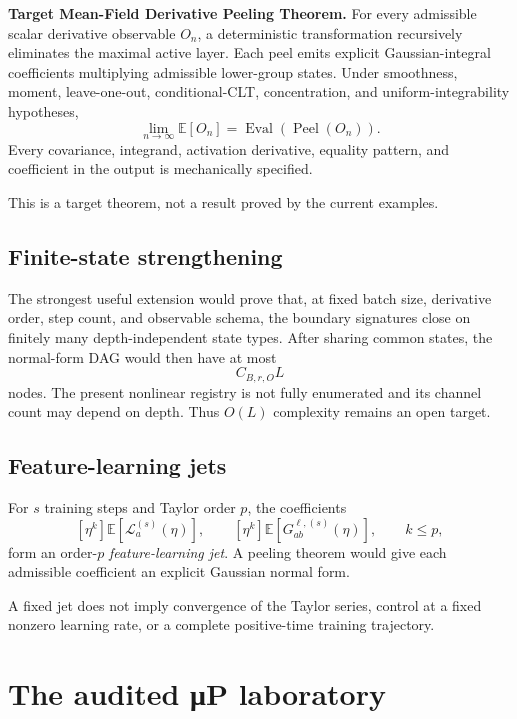 \documentclass[9pt,oneside]{extreport}
\begin{document}
\begin{statusbox}
\textbf{Target Mean-Field Derivative Peeling Theorem.}
For every admissible scalar derivative observable $O_n$, a deterministic
transformation recursively eliminates the maximal active layer.  Each peel
emits explicit Gaussian-integral coefficients multiplying admissible
lower-group states.  Under smoothness, moment, leave-one-out,
conditional-CLT, concentration, and uniform-integrability hypotheses,
\[
\lim_{n\to\infty}\mathbb E[O_n]
=\operatorname{Eval}(\operatorname{Peel}(O_n)).
\]
Every covariance, integrand, activation derivative, equality pattern, and
coefficient in the output is mechanically specified.
\end{statusbox}

This is a target theorem, not a result proved by the current examples.

\section{Finite-state strengthening}

The strongest useful extension would prove that, at fixed batch size,
derivative order, step count, and observable schema, the boundary signatures
close on finitely many depth-independent state types.  After sharing common
states, the normal-form DAG would then have at most
\[
C_{B,r,O}L
\]
nodes.  The present nonlinear registry is not fully enumerated and its channel
count may depend on depth.  Thus $O(L)$ complexity remains an open target.

\section{Feature-learning jets}

For $s$ training steps and Taylor order $p$, the coefficients
\[
[\eta^k]\mathbb E[\mathcal L_a^{(s)}(\eta)],
\qquad
[\eta^k]\mathbb E[G_{ab}^{\ell,(s)}(\eta)],
\qquad k\le p,
\]
form an order-$p$ \emph{feature-learning jet}.  A peeling theorem would give
each admissible coefficient an explicit Gaussian normal form.

\begin{warningbox}
A fixed jet does not imply convergence of the Taylor series, control at a
fixed nonzero learning rate, or a complete positive-time training trajectory.
\end{warningbox}

\chapter{The audited μP laboratory}
\end{document}
